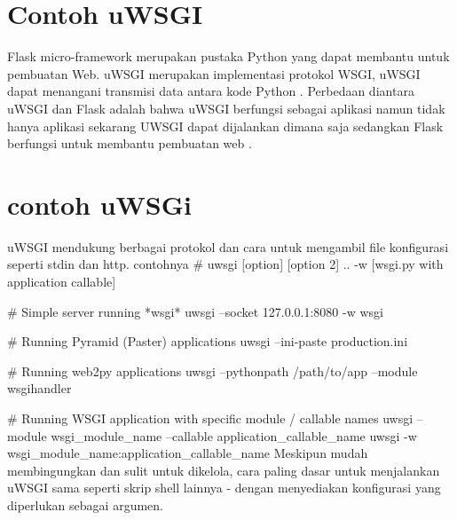 \section{Contoh uWSGI}
Flask micro-framework merupakan pustaka Python yang dapat membantu untuk pembuatan Web. uWSGI merupakan implementasi protokol WSGI, uWSGI dapat menangani transmisi data
antara kode Python . Perbedaan diantara uWSGI dan Flask adalah bahwa uWSGI berfungsi sebagai aplikasi namun tidak hanya aplikasi sekarang UWSGI dapat dijalankan dimana saja sedangkan Flask berfungsi untuk membantu pembuatan web \cite{mulerolinked}.

\section{contoh uWSGi}
uWSGI mendukung berbagai protokol dan cara untuk mengambil file  konfigurasi seperti stdin dan http. contohnya
# uwsgi [option] [option 2] .. -w [wsgi.py with application callable]

# Simple server running *wsgi*
uwsgi --socket 127.0.0.1:8080 -w wsgi

# Running Pyramid (Paster) applications
uwsgi --ini-paste production.ini

# Running web2py applications
uwsgi --pythonpath /path/to/app --module wsgihandler

# Running WSGI application with specific module / callable names
uwsgi --module wsgi_module_name --callable application_callable_name
uwsgi -w wsgi_module_name:application_callable_name 
Meskipun mudah membingungkan dan sulit untuk dikelola, cara paling dasar untuk menjalankan uWSGI sama seperti skrip shell lainnya - dengan menyediakan konfigurasi yang diperlukan sebagai argumen\cite{cencini2017data}.

